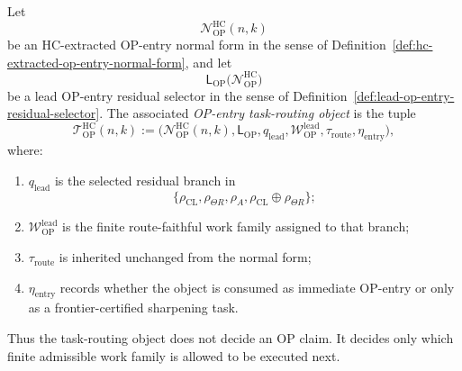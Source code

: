 \begin{definition}
\label{def:op-entry-task-routing-object}
Let
\[
 \mathcal N_{\mathrm{OP}}^{\mathrm{HC}}(n,k)
\]
be an HC-extracted OP-entry normal form in the sense of Definition~\ref{def:hc-extracted-op-entry-normal-form}, and let
\[
 \mathsf L_{\mathrm{OP}}
 \bigl(\mathcal N_{\mathrm{OP}}^{\mathrm{HC}}\bigr)
\]
be a lead OP-entry residual selector in the sense of Definition~\ref{def:lead-op-entry-residual-selector}. The associated \emph{OP-entry task-routing object} is the tuple
\[
 \mathcal T_{\mathrm{OP}}^{\mathrm{HC}}(n,k)
 :=
 \bigl(
 \mathcal N_{\mathrm{OP}}^{\mathrm{HC}}(n,k),
 \mathsf L_{\mathrm{OP}},
 q_{\mathrm{lead}},
 \mathcal W_{\mathrm{OP}}^{\mathrm{lead}},
 \tau_{\mathrm{route}},
 \eta_{\mathrm{entry}}
 \bigr),
\]
where:
\begin{enumerate}[leftmargin=2em,label=(\alph*)]
 \item $q_{\mathrm{lead}}$ is the selected residual branch in
 \[
 \{\rho_{\mathrm{CL}},\rho_{\Theta R},\rho_A,
 \rho_{\mathrm{CL}}\oplus\rho_{\Theta R}\};
 \]
 \item $\mathcal W_{\mathrm{OP}}^{\mathrm{lead}}$ is the finite route-faithful work family assigned to that branch;
 \item $\tau_{\mathrm{route}}$ is inherited unchanged from the normal form;
 \item $\eta_{\mathrm{entry}}$ records whether the object is consumed as immediate OP-entry or only as a frontier-certified sharpening task.
\end{enumerate}
Thus the task-routing object does not decide an OP claim. It decides only which finite admissible work family is allowed to be executed next.
\end{definition}

